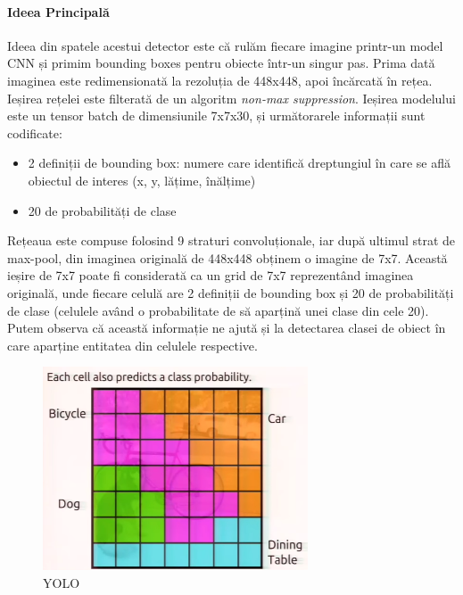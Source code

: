 \paragraph{Ideea Principală}
Ideea din spatele acestui detector este că rulăm fiecare imagine printr-un model CNN și primim bounding boxes pentru obiecte într-un singur pas. Prima dată imaginea este redimensionată la rezoluția de 448x448, apoi încărcată în rețea. Ieșirea rețelei este filterată de un algoritm \textit{non-max suppression}.
Ieșirea modelului este un tensor batch de dimensiunile 7x7x30, și următorarele informații sunt codificate:
\begin{itemize}
	\item 2 definiții de bounding box: numere care identifică dreptungiul în care se află obiectul de interes (x, y, lățime, înălțime)
	\item 20 de probabilități de clase
\end{itemize}
Rețeaua este compuse folosind 9 straturi convoluționale, iar după ultimul strat de max-pool, din imaginea originală de 448x448 obținem o imagine de 7x7.\newline
Această ieșire de 7x7 poate fi considerată ca un grid de 7x7 reprezentând imaginea originală, unde fiecare celulă are 2 definiții de bounding box și 20 de probabilități de clase (celulele având o probabilitate de să aparțină unei clase din cele 20). Putem observa că această informație ne ajută și la detectarea clasei de obiect în care aparține entitatea din celulele respective.

\begin{figure}[h!]
    	\centering
	\captionsetup{justification=centering, margin=2cm}
	\includegraphics[width=0.7\textwidth]{figures/yolo_cell_class.png}
	\caption{YOLO \cite{rcnn_vs_fast_rcnn}}
	\label{fig:class_detect_segment}
\end{figure}

